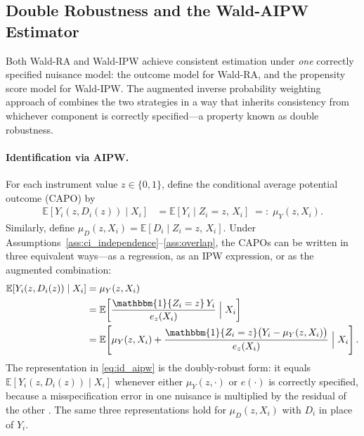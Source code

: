\documentclass[12pt,a4paper]{article}
\newcommand{\E}{\mathbb{E}}
\newcommand{\ind}{\mathbbm{1}}
\begin{document}
\subsection{Double Robustness and the Wald-AIPW Estimator}
\label{subsec:wald_aipw_dr}

Both Wald-RA and Wald-IPW achieve consistent estimation under \emph{one} correctly
specified nuisance model: the outcome model for Wald-RA, and the propensity score model
for Wald-IPW. The augmented inverse probability weighting approach of
\citet{tan2006regression} combines the two strategies in a way that inherits consistency
from whichever component is correctly specified---a property known as double robustness.

\paragraph{Identification via AIPW.}

For each instrument value $z \in \{0,1\}$, define the conditional average potential
outcome (CAPO) by
\begin{align}
    \E[Y_i(z,D_i(z)) \mid X_i]
    &= \E[Y_i \mid Z_i = z,\, X_i]
    \;=:\; \mu_Y(z, X_i).
    \label{eq:capo_y}
\end{align}
Similarly, define $\mu_D(z, X_i) = \E[D_i \mid Z_i = z,\, X_i]$.
Under Assumptions~\ref{ass:ci_independence}--\ref{ass:overlap},
the CAPOs can be written in three equivalent ways---as a regression, as an IPW
expression, or as the augmented combination:
\begin{align}
    \E[Y_i(z,D_i(z)) \mid X_i]
    &= \mu_Y(z, X_i)
    \label{eq:id_ra} \\
    &= \E\!\left[
        \frac{\ind\{Z_i = z\}\, Y_i}{e_z(X_i)}
        \;\Big|\; X_i
    \right]
    \label{eq:id_ipw} \\
    &= \E\!\left[
        \mu_Y(z, X_i)
        +
        \frac{\ind\{Z_i = z\}\bigl(Y_i - \mu_Y(z, X_i)\bigr)}{e_z(X_i)}
        \;\Big|\; X_i
    \right].
    \label{eq:id_aipw}
\end{align}
The representation in \eqref{eq:id_aipw} is the doubly-robust form: it equals
$\E[Y_i(z,D_i(z)) \mid X_i]$ whenever either $\mu_Y(z, \cdot)$ or $e(\cdot)$ is correctly
specified, because a misspecification error in one nuisance is multiplied by the residual of
the other \citep[Section~4]{tan2006regression}. The same three representations hold for
$\mu_D(z, X_i)$ with $D_i$ in place of $Y_i$.
\end{document}
